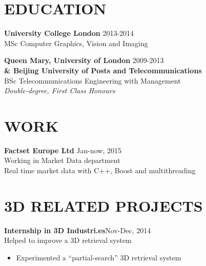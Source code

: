 \documentclass[line,margin]{res}
\begin{document}
\address{}
\address{}

\begin{resume}



\section{EDUCATION} 
{\bf University College London} \hfill{\textcolor[rgb]{0.7,0.7,0.7}{2013-2014}}\\
MSc Computer Graphics, Vision and Imaging

{\bf Queen Mary, University of London} \hfill{\textcolor[rgb]{0.7,0.7,0.7}{2009-2013}}\\
{\bf \& Beijing University of Posts and Telecommunications}\\
BSc Telecommunications Engineering with Management\\
\emph{Double-degree, First Class Honours}


\section{WORK}
{\bf Factset Europe Ltd}
\hfill{\textcolor[rgb]{0.7,0.7,0.7}{Jan-now, 2015}}\\
Working in Market Data department\\
Real time market data with C++, Boost and multithreading


\section{3D RELATED PROJECTS}
\renewcommand{\labelitemi}{-}
{\bf Internship in 3D Industri.es}\hfill{\textcolor[rgb]{0.7,0.7,0.7}{Nov-Dec, 2014}}\\
Helped to improve a 3D retrieval system
\begin{itemize}\itemsep -2pt %
    \item Experimented a ``partial-search'' 3D retrieval system
\end{itemize}


\end{resume}
\end{document}

